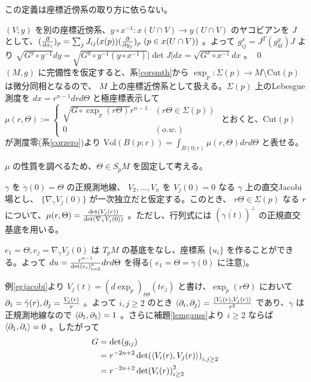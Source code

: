 \documentclass[dvipdfmx,a4paper]{jsreport}
\theoremstyle{definition}
\newcommand{\der}{\partial}
\begin{document}
\lem この定義は座標近傍系の取り方に依らない。

\prf $(V;y)$ を別の座標近傍系、$y\circ x^{-1}:x(U\cap V) \to y(U\cap V)$ のヤコビアンを $J$ として、$({\der \over \der x_i})_p=\sum_j J_{ij}(x(p))({\der \over \der y_j})_p \ (p \in x(U \cap V))$ 。よって $g_{ij}^x=J^T(g_{kl}^y)J$ より $\sqrt{G^y\circ y^{-1}} dy=\sqrt{G^y \circ y^{-1}(y \circ x^{-1})}|\det J|dx=\sqrt{G^x \circ x^{-1}}dx$ 。 \qed
\\

$(M,g)$ に完備性を仮定すると、系\ref{corsmth}から $\exp_p:\Sigma(p) \to M \setminus \mbox{Cut}(p)$ は微分同相となるので、 $M$ 上の座標近傍系として扱える。$\Sigma(p)$ 上のLebesgue測度を $dx=r^{n-1}drd\Theta$ と極座標表示して $\mu(r,\Theta):=\begin{cases}
    \sqrt{G \circ \exp_p(r\Theta)}r^{n-1} & (r\Theta \in \Sigma(p)) \\
    0 & (o.w.)
\end{cases}$ とおくと、$\mbox{Cut}(p)$ が測度零(系\ref{corzero})より $\mbox{Vol}(B(p;r))=\int_{B(0;r)} \mu(r,\Theta)drd\Theta$ と表せる。

$\mu$ の性質を調べるため、$\Theta \in S_pM$ を固定して考える。

\prop $\gamma$ を $\dot{\gamma}(0)=\Theta$ の正規測地線、 $V_2,\ldots,V_n$ を $V_j(0)=0$ なる $\gamma$ 上の直交Jacobi場とし、 $\{\nabla_{\dot{\gamma}}V_j(0)\}$ が一次独立だと仮定する。このとき、 $r\Theta \in \Sigma(p)$ なる $r$ について、$\mu(r,\Theta)={\det(V_j(r)) \over \det(\nabla_{\dot{\gamma}}V_j(0))}$ 。ただし、行列式には $(\dot{\gamma(t)})^{\bot}$ の正規直交基底を用いる。

\prf $e_1=\Theta,e_j=\nabla_{\dot{\gamma}}V_j(0)$ は $T_pM$ の基底をなし、座標系 $\{u_i\}$ を作ることができる。よって $du={r^{n-1} \over \det(e_i)_{i=2}^n}drd\Theta$ を得る( $e_1=\Theta=\dot{\gamma}(0)$ に注意)。

例\ref{egjacobi}より $V_j(t)=(d\exp_p)_{t\Theta}(te_j)$ と書け、$\exp_p(r\Theta)$ において $\der_1=\dot{\gamma}(r),\der_j={V_j(r) \over r}$ 。よって $i,j \geq 2$ のとき $\ev{\der_i,\der_j}={\ev{V_i(r),V_j(r)} \over r^2}$ であり、$\gamma$ は正規測地線なので $\ev{\der_1,\der_1}=1$ 。さらに補題\ref{lemgauss}より $i\geq 2$ ならば $\ev{\der_1,\der_i}=0$ 。したがって
\begin{align*}
    G &=\det(g_{ij}) \\
    &= r^{-2n+2}\det(\ev{V_i(r),V_j(r)})_{i,j \geq 2} \\
    &= r^{-2n+2}\det(V_i(r))_{i \geq 2}^2
\end{align*}
\end{document}
